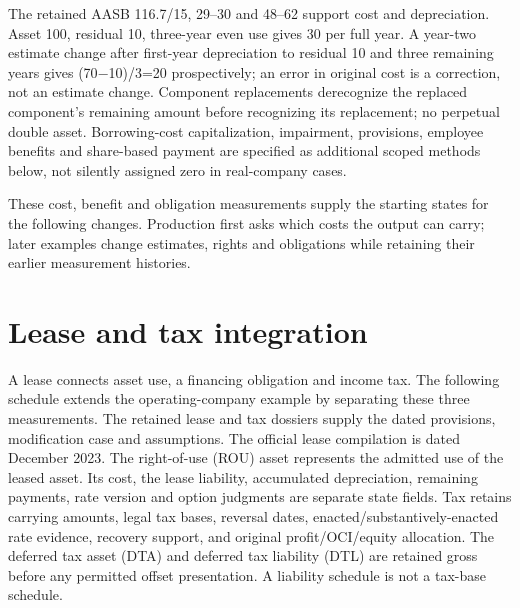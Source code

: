 The retained AASB 116.7/15, 29--30 and 48--62 support cost and depreciation. Asset 100, residual 10, three-year even use gives 30 per full year. A year-two estimate change after first-year depreciation to residual 10 and three remaining years gives (70\ensuremath{-}10)/3=20 prospectively; an error in original cost is a correction, not an estimate change. Component replacements derecognize the replaced component's remaining amount before recognizing its replacement; no perpetual double asset. Borrowing-cost capitalization, impairment, provisions, employee benefits and share-based payment are specified as additional scoped methods below, not silently assigned zero in real-company cases.







These cost, benefit and obligation measurements supply the starting states
for the following changes. Production first asks which costs the output
can carry; later examples change estimates, rights and obligations while
retaining their earlier measurement histories.

















\hypertarget{lease-and-tax-integration}{%
\section{Lease and tax integration}\label{method-corporate-methods-lease-and-tax-integration}}

A lease connects asset use, a financing obligation and income tax. The following schedule extends the operating-company example by separating these three measurements. The retained lease and tax dossiers supply the dated provisions, modification case and assumptions. The official lease compilation is dated December 2023. The right-of-use (ROU) asset represents the admitted use of the leased asset. Its cost, the lease liability, accumulated depreciation, remaining payments, rate version and option judgments are separate state fields. Tax retains carrying amounts, legal tax bases, reversal dates, enacted/substantively-enacted rate evidence, recovery support, and original profit/OCI/equity allocation. The deferred tax asset (DTA) and deferred tax liability (DTL) are retained gross before any permitted offset presentation. A liability schedule is not a tax-base schedule.

